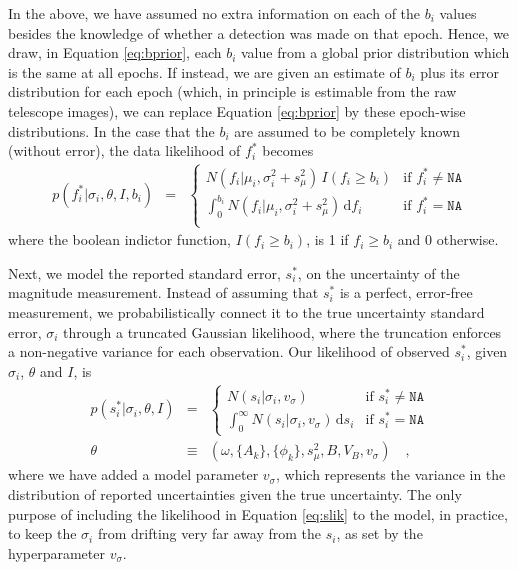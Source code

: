 \documentclass[12pt,preprint]{aastex}
\newcommand{\dd}{\mathrm{d}}
\newcommand{\fobs}{f_i^*}
\newcommand{\sobs}{s_i^*}
\begin{document}
In the above, we have assumed no extra information on each of the $b_i$ values besides the knowledge of whether a detection was made on that epoch.  Hence, we draw, in Equation \ref{eq:bprior}, each $b_i$ value from a global prior distribution which is the same at all epochs.  If instead, we are given an estimate of $b_i$ plus its error distribution for each epoch (which, in principle is estimable from the raw telescope images), we can replace Equation \ref{eq:bprior} by these epoch-wise distributions.  In the case that the $b_i$ are assumed to be completely known (without error), the data likelihood of $\fobs$ becomes
\begin{eqnarray}\displaystyle
p(\fobs |\sigma_i,\theta,I, b_i) &=& \left\{\begin{array}{ll}
  N(f_i | \mu_i,  \sigma_i^2 + s_{\mu}^2)\,  I(f_i \ge b_i) & \mbox{if $\fobs \ne \texttt{NA}$} \\
 \int_{0}^{b_i} N(f_i | \mu_i, \sigma_i^2 + s_{\mu}^2)\, \dd f_i & \mbox{if $\fobs = \texttt{NA}$} \\
\end{array}\right.\label{eq:mlik_s}
\end{eqnarray}
where the boolean indictor function, $I(f_i \ge b_i)$, is 1 if $f_i \ge b_i$ and 0 otherwise.

Next, we model the reported standard error, $\sobs$, on the uncertainty of the magnitude measurement.  Instead of assuming that $\sobs$ is a perfect, error-free measurement, we probabilistically connect it to the true uncertainty standard error, $\sigma_i$ through a truncated Gaussian likelihood, where the truncation enforces a non-negative variance for each observation.  Our likelihood of observed $\sobs$, given $\sigma_i$, $\theta$ and $I$, is
\begin{eqnarray}\displaystyle
p(\sobs | \sigma_i, \theta,I) &=& \left\{\begin{array}{ll}
  N(s_i|\sigma_i,v_\sigma) & \mbox{if $\sobs \ne \texttt{NA}$} \\
  \int_{0}^{\infty}  N(s_i | \sigma_i,v_\sigma)\,  \dd s_i & \mbox{if $\sobs = \texttt{NA}$}
\end{array}\right.\label{eq:slik}
\\
\theta &\equiv& (\omega, \{A_k\}, \{\phi_k\}, s_\mu^2, B, V_B ,v_\sigma) \quad ,
\end{eqnarray}
where we have added a model parameter $v_\sigma$, which represents the
variance in the distribution of reported uncertainties given the true
uncertainty.  The only purpose of
including the likelihood in Equation \ref{eq:slik} to the model, in practice, to keep the $\sigma_i$ from
drifting very far away from the $s_i$, as set by the hyperparameter
$v_\sigma$.
\end{document}
